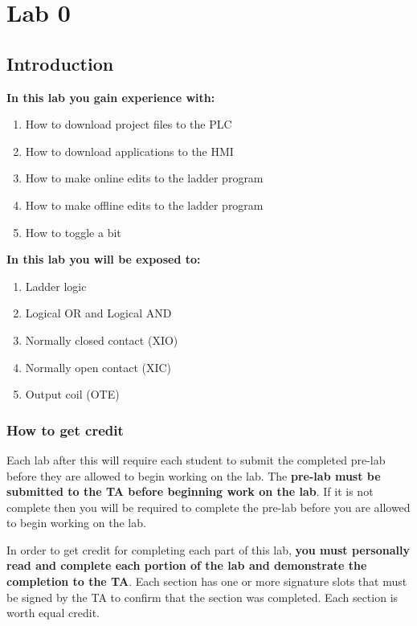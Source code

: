 \chapter{Lab 0}
\setcounter{TASignatures}{0}
\setcounter{AsideCounter}{0}

\section{Introduction}
    \vspace{0.1em}

    \textbf{In this lab you gain experience with:}
    \begin{enumerate}
        \item How to download project files to the PLC
        \item How to download applications to the HMI
        \item How to make online edits to the ladder program
        \item How to make offline edits to the ladder program
        \item How to toggle a bit
    \end{enumerate}
    
    \vspace{1em}
    \textbf{In this lab you will be exposed to:}
    \begin{enumerate}
        \item Ladder logic
        \item Logical OR and Logical AND
        \item Normally closed contact (XIO)
        \item Normally open contact (XIC)
        \item Output coil (OTE)
    \end{enumerate}
    
\subsection{How to get credit}
Each lab after this will require each student to submit the completed pre-lab before they are allowed to begin working on the lab. The \textbf{pre-lab must be submitted to the TA before beginning work on the lab}. If it is not complete then you will be required to complete the pre-lab before you are allowed to begin working on the lab.

In order to get credit for completing each part of this lab, \textbf{you must personally read and complete each portion of the lab and demonstrate the completion to the TA}. Each section has one or more signature slots that must be signed by the TA to confirm that the section was completed. Each section is worth equal credit. 

